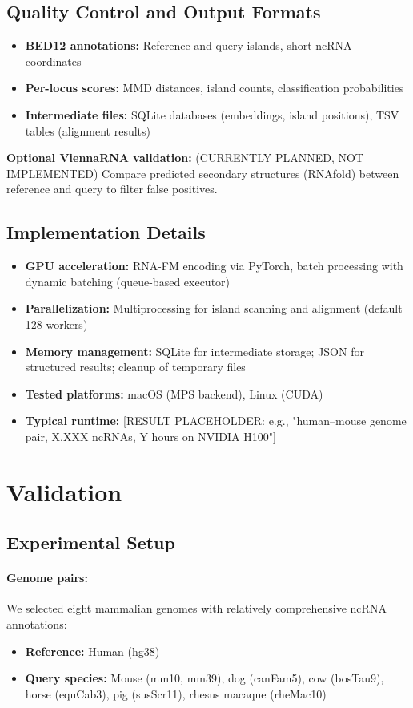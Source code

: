 \documentclass[11pt]{article}
\begin{document}
\subsection{Quality Control and Output Formats}
\begin{itemize}
\item \textbf{BED12 annotations:} Reference and query islands, short ncRNA coordinates
\item \textbf{Per-locus scores:} MMD distances, island counts, classification probabilities
\item \textbf{Intermediate files:} SQLite databases (embeddings, island positions), TSV tables (alignment results)
\end{itemize}

\textbf{Optional ViennaRNA validation:} (CURRENTLY PLANNED, NOT IMPLEMENTED) Compare predicted secondary structures (RNAfold) between reference and query to filter false positives.

\subsection{Implementation Details}
\begin{itemize}
\item \textbf{GPU acceleration:} RNA-FM encoding via PyTorch, batch processing with dynamic batching (queue-based executor)
\item \textbf{Parallelization:} Multiprocessing for island scanning and alignment (default 128 workers)
\item \textbf{Memory management:} SQLite for intermediate storage; JSON for structured results; cleanup of temporary files
\item \textbf{Tested platforms:} macOS (MPS backend), Linux (CUDA)
\item \textbf{Typical runtime:} [RESULT PLACEHOLDER: e.g., "human–mouse genome pair, X,XXX ncRNAs, Y hours on NVIDIA H100"]
\end{itemize}

\section{Validation}

\subsection{Experimental Setup}

\paragraph{Genome pairs:}
We selected eight mammalian genomes with relatively comprehensive ncRNA annotations:
\begin{itemize}
\item \textbf{Reference:} Human (hg38)
\item \textbf{Query species:} Mouse (mm10, mm39), dog (canFam5), cow (bosTau9), horse (equCab3), pig (susScr11), rhesus macaque (rheMac10)
\end{itemize}
\end{document}
